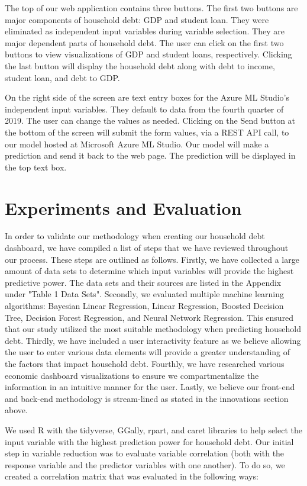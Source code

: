 \documentclass[sigconf,nonacm,11pt]{acmart}
\begin{document}
The top of our web application contains three buttons. The first two buttons are major components of household debt: GDP and student loan. They were eliminated as independent input variables during variable selection. They are major dependent parts of household debt. The user can click on the first two buttons to view visualizations of GDP and student loans, respectively. Clicking the last button will display the household debt along with debt to income, student loan, and debt to GDP.  

On the right side of the screen are text entry boxes for the Azure ML Studio's independent input variables. They default to data from the fourth quarter of 2019. The user can change the values as needed. Clicking on the Send button at the bottom of the screen will submit the form values, via a REST API call, to our model hosted at Microsoft Azure ML Studio. Our model will make a prediction and send it back to the web page.  The prediction will be displayed in the top text box.

\section{Experiments and Evaluation}
In order to validate our methodology when creating our household debt dashboard, we have compiled a list of steps that we have reviewed throughout our process. These steps are outlined as follows. Firstly, we have collected a large amount of data sets to determine which input variables will provide the highest predictive power. The data sets and their sources are listed in the Appendix under "Table 1 Data Sets". Secondly, we evaluated multiple machine learning algorithms: Bayesian Linear Regression, Linear Regression, Boosted Decision Tree, Decision Forest Regression, and Neural Network Regression. This ensured that our study utilized the most suitable methodology when predicting household debt. Thirdly, we have included a user interactivity feature as we believe allowing the user to enter various data elements will provide a greater understanding of the factors that impact household debt. Fourthly, we have researched various economic dashboard visualizations to ensure we compartmentalize the information in an intuitive manner for the user. Lastly, we believe our front-end and back-end methodology is stream-lined as stated in the innovations section above. 


We used R with the tidyverse, GGally, rpart, and caret libraries to help select the input variable with the highest prediction power for household debt. Our initial step in variable reduction was to evaluate variable correlation (both with the response variable and the predictor variables with one another).  To do so, we created a correlation matrix that was evaluated in the following ways:
\end{document}
